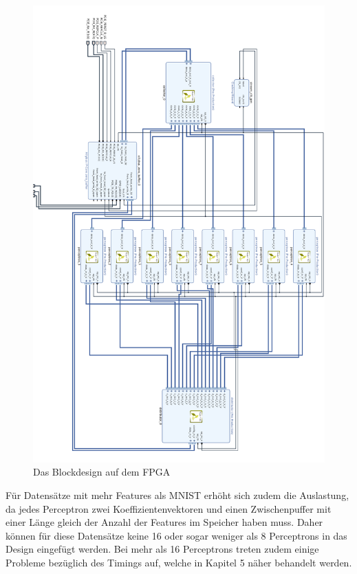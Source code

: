 \begin{figure}
\centering
\includegraphics[scale=0.7]{bilder/blockdesign}
\caption{Das Blockdesign auf dem FPGA}
\end{figure}\newpage
Für Datensätze mit mehr Features als MNIST erhöht sich zudem die Auslastung, da jedes Perceptron zwei Koeffizientenvektoren und einen Zwischenpuffer mit einer Länge gleich der Anzahl der Features im Speicher haben muss. Daher können für diese Datensätze keine 16 oder sogar weniger als 8 Perceptrons in das Design eingefügt werden.
Bei mehr als 16 Perceptrons treten zudem einige Probleme bezüglich des Timings auf, welche in Kapitel 5 näher behandelt werden.

